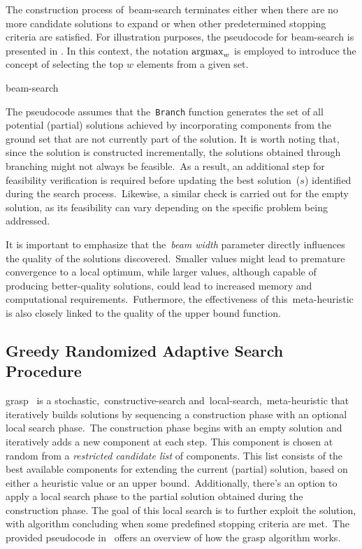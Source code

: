The construction process of~\acrshort{beam-search} terminates either when there
are no more candidate solutions to expand or when other predetermined stopping
criteria are satisfied. For illustration purposes, the pseudocode for
\acrshort{beam-search} is presented in .
In this context, the notation $\operatorname*{argmax}_{w}$ is employed to introduce the concept
of selecting the top $w$ elements from a given set.

\begin{algorithm}[h]
  
  \caption{\acrlong{beam-search}}
  \label{algorithm:beam-search}
\end{algorithm}

The pseudocode assumes that the~\texttt{Branch} function generates the set of
all potential (partial) solutions achieved by incorporating components from the
ground set that are not currently part of the solution. It is worth noting that,
since the solution is constructed incrementally, the solutions obtained through
branching might not always be feasible.~As a result, an additional step for
feasibility verification is required before updating the best solution~($s$)
identified during the search process.~Likewise, a similar check is carried
out for the empty solution, as its feasibility can vary depending on the
specific problem being addressed.

It is important to emphasize that the~\emph{beam width} parameter directly
influences the quality of the solutions discovered.~Smaller values might lead to
premature convergence to a local optimum, while larger values, although capable
of producing better-quality solutions, could lead to increased memory and
computational requirements.~Futhermore, the effectiveness of
this~\acrshort{meta-heuristic} is also closely linked to the quality of the
upper bound function.

\subsection{Greedy Randomized Adaptive Search Procedure}
\label{subsec:grasp}

\acrfull{grasp}~\cite{resende2010greedya,outeiro2021application,blum2003metaheuristics}
is a stochastic,~\acrshort{constructive-search}
and~\acrshort{local-search},~\acrshort{meta-heuristic} that iteratively builds
solutions by sequencing a construction phase with an optional local search phase.~The
construction phase begins with an empty solution and iteratively adds a new
component at each step. This component is chosen at random from a
\emph{restricted candidate list} of components. This list consists of the best
available components for extending the current (partial) solution, based on
either a heuristic value or an upper bound.~Additionally, there's an option to
apply a local search phase to the partial solution obtained during the
construction phase. The goal of this local search is to further exploit the
solution, with algorithm concluding when some predefined stopping criteria are
met.~The provided pseudocode in~ offers an overview of how the
\acrshort{grasp} algorithm works.

